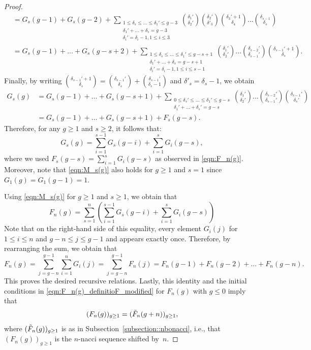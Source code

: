\documentclass[11pt]{amsart}
\numberwithin{equation}{section}
\theoremstyle{plain}
\newcommand{\<}{\left \langle}
\renewcommand{\>}{\right \rangle}
\theoremstyle{definition}
\theoremstyle{remark}
\begin{document}
\begin{proof}
\begin{align*}
   &= G_s(g - 1) + G_s(g - 2) + \sum_{\substack{1 \leq \delta_s \leq \ldots \leq \delta_1' \leq g - 3 \\ \delta_1' + \ldots + \delta_s = g - 3 \\ \delta_i' = \delta_i - 1, 1\leq i \leq 3}} {\delta_1' \choose \delta_2'} {\delta_2' \choose \delta'_3} {\delta_3' + 1 \choose \delta_4} \ldots {\delta_{s -1} \choose \delta_{s}}\\
   &= G_s(g - 1) + \ldots + G_s(g - s + 2) + \sum_{\substack{1 \leq \delta_s \leq \ldots \leq \delta_1' \leq g - s + 1 \\ \delta_1' + \ldots + \delta_s = g - s +1 \\ \delta_i' = \delta_i - 1, 1\leq i \leq s - 1}} {\delta_1' \choose \delta_2'} \ldots {\delta_{s -2}' \choose \delta_{s - 1}'} {\delta_{s -1}' + 1 \choose \delta_{s}}.
\end{align*}
Finally, by writing ${\delta_{s -1}' + 1 \choose \delta_{s}} = {\delta_{s -1}' \choose \delta_{s}} + {\delta_{s -1}' \choose \delta_{s} - 1}$ and $\delta'_s = \delta_s-1$, we obtain 
\begin{align*}
G_s(g) &= G_s(g - 1) + \ldots + G_s(g - s + 1) + \sum_{\substack{0 \leq \delta_s' \leq \ldots \leq \delta_1' \leq g - s \\ \delta_1' + \ldots + \delta_s' = g - s}} {\delta_1' \choose \delta_2'} \ldots {\delta_{s -2}' \choose \delta_{s - 1}'} {\delta_{s -1}' \choose \delta_{s}'}  \\
&= G_s(g - 1) + \ldots + G_s(g - s + 1) + F_s(g - s).
\end{align*}
Therefore, for any $g \geq 1$ and $s \geq 2$, it follows that: \begin{equation}
    G_s(g) = \sum_{i = 1}^{s - 1}G_s(g - i) + \sum_{i = 1}^sG_i(g - s),
\label{eqn:M_s(g)}
\end{equation}
where we used $F_s(g - s) = \sum_{i = 1}^sG_i(g - s)$ as observed in \eqref{eqn:F_n(g)}. 
Moreover, note that \eqref{eqn:M_s(g)} also holds for $g \geq 1$ and $s = 1$ since $G_1(g) = G_1(g - 1) = 1$.


Using \eqref{eqn:M_s(g)} for $g \geq 1$ and $s \geq 1$, we obtain that 
\begin{equation*}
F_n(g) = \sum_{s = 1}^n\left ( \sum_{i = 1}^{s - 1}G_s(g - i) + \sum_{i = 1}^sG_i(g - s) \right)
\end{equation*}
Note that on the right-hand side of this equality, every element $G_i(j)$ for $1 \leq i \leq n$ and $g - n \leq j \leq g - 1$ and appears exactly once. Therefore, by rearranging the sum, we obtain that
$$F_n(g) = \sum_{j = g - n}^{g - 1} \sum_{i = 1}^{n}G_i(j) = \sum_{j = g - n}^{g - 1} F_n(j) = F_n(g - 1) + F_n(g - 2) + \ldots + F_n(g - n).$$
This proves the desired recursive relations. Lastly, this identity and the initial conditions in \eqref{eqn:F_n(g)_definitioF_modified} for $F_n(g)$ with $g \leq 0$ imply that $$(F_n(g))_{g \geq 1} = (\Tilde{F}_n(g + n))_{g \geq 1},$$ where $(\Tilde{F}_n(g))_{g \geq 1}$ is as in Subsection~\ref{subsection::nbonacci}, 
i.e., that $(F_n(g))_{g \geq 1}$ is the $n$-nacci sequence shifted by~$n$. 
\end{proof}
\end{document}
